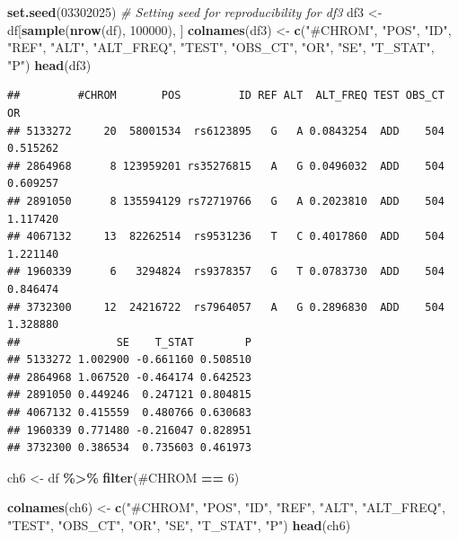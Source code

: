 \documentclass[
  12pt,
]{article}
\newenvironment{Shaded}{\begin{snugshade}}{\end{snugshade}}
\newcommand{\AttributeTok}[1]{\textcolor[rgb]{0.13,0.29,0.53}{#1}}
\newcommand{\CommentTok}[1]{\textcolor[rgb]{0.56,0.35,0.01}{\textit{#1}}}
\newcommand{\DecValTok}[1]{\textcolor[rgb]{0.00,0.00,0.81}{#1}}
\newcommand{\FunctionTok}[1]{\textcolor[rgb]{0.13,0.29,0.53}{\textbf{#1}}}
\newcommand{\NormalTok}[1]{#1}
\newcommand{\OtherTok}[1]{\textcolor[rgb]{0.56,0.35,0.01}{#1}}
\newcommand{\SpecialCharTok}[1]{\textcolor[rgb]{0.81,0.36,0.00}{\textbf{#1}}}
\newcommand{\StringTok}[1]{\textcolor[rgb]{0.31,0.60,0.02}{#1}}
\begin{document}
\begin{Shaded}
\begin{Highlighting}[]
\FunctionTok{set.seed}\NormalTok{(}\DecValTok{03302025}\NormalTok{)  }\CommentTok{\# Setting seed for reproducibility for df3}
\NormalTok{df3 }\OtherTok{\textless{}{-}}\NormalTok{ df[}\FunctionTok{sample}\NormalTok{(}\FunctionTok{nrow}\NormalTok{(df), }\DecValTok{100000}\NormalTok{), ]}
\FunctionTok{colnames}\NormalTok{(df3) }\OtherTok{\textless{}{-}} \FunctionTok{c}\NormalTok{(}\StringTok{"\#CHROM"}\NormalTok{, }\StringTok{"POS"}\NormalTok{, }\StringTok{"ID"}\NormalTok{, }\StringTok{"REF"}\NormalTok{, }\StringTok{"ALT"}\NormalTok{, }\StringTok{"ALT\_FREQ"}\NormalTok{, }\StringTok{"TEST"}\NormalTok{, }\StringTok{"OBS\_CT"}\NormalTok{, }\StringTok{"OR"}\NormalTok{, }\StringTok{"SE"}\NormalTok{, }\StringTok{"T\_STAT"}\NormalTok{, }\StringTok{"P"}\NormalTok{)}
\FunctionTok{head}\NormalTok{(df3)}
\end{Highlighting}
\end{Shaded}

\begin{verbatim}
##         #CHROM       POS         ID REF ALT  ALT_FREQ TEST OBS_CT       OR
## 5133272     20  58001534  rs6123895   G   A 0.0843254  ADD    504 0.515262
## 2864968      8 123959201 rs35276815   A   G 0.0496032  ADD    504 0.609257
## 2891050      8 135594129 rs72719766   G   A 0.2023810  ADD    504 1.117420
## 4067132     13  82262514  rs9531236   T   C 0.4017860  ADD    504 1.221140
## 1960339      6   3294824  rs9378357   G   T 0.0783730  ADD    504 0.846474
## 3732300     12  24216722  rs7964057   A   G 0.2896830  ADD    504 1.328880
##               SE    T_STAT        P
## 5133272 1.002900 -0.661160 0.508510
## 2864968 1.067520 -0.464174 0.642523
## 2891050 0.449246  0.247121 0.804815
## 4067132 0.415559  0.480766 0.630683
## 1960339 0.771480 -0.216047 0.828951
## 3732300 0.386534  0.735603 0.461973
\end{verbatim}

\begin{Shaded}
\begin{Highlighting}[]
\NormalTok{ch6 }\OtherTok{\textless{}{-}}\NormalTok{ df }\SpecialCharTok{\%\textgreater{}\%} \FunctionTok{filter}\NormalTok{(}\StringTok{\textasciigrave{}}\AttributeTok{\#CHROM}\StringTok{\textasciigrave{}} \SpecialCharTok{==} \DecValTok{6}\NormalTok{)}

\FunctionTok{colnames}\NormalTok{(ch6) }\OtherTok{\textless{}{-}} \FunctionTok{c}\NormalTok{(}\StringTok{"\#CHROM"}\NormalTok{, }\StringTok{"POS"}\NormalTok{, }\StringTok{"ID"}\NormalTok{, }\StringTok{"REF"}\NormalTok{, }\StringTok{"ALT"}\NormalTok{, }\StringTok{"ALT\_FREQ"}\NormalTok{, }\StringTok{"TEST"}\NormalTok{, }\StringTok{"OBS\_CT"}\NormalTok{, }\StringTok{"OR"}\NormalTok{, }\StringTok{"SE"}\NormalTok{, }\StringTok{"T\_STAT"}\NormalTok{, }\StringTok{"P"}\NormalTok{)}
\FunctionTok{head}\NormalTok{(ch6)}
\end{Highlighting}
\end{Shaded}
\end{document}
